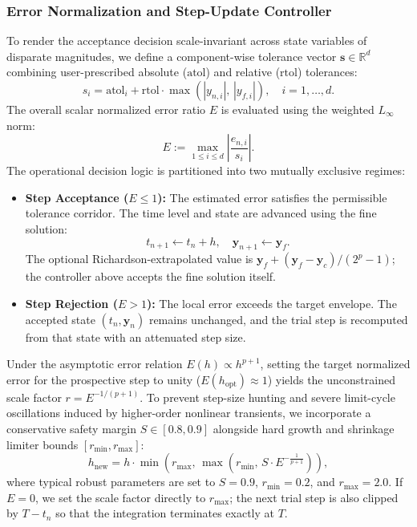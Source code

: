 \documentclass[11pt,a4paper]{article}
\theoremstyle{definition}
\theoremstyle{remark}
\begin{document}
\subsubsection{Error Normalization and Step-Update Controller}
To render the acceptance decision scale-invariant across state variables of disparate magnitudes, we define a component-wise tolerance vector $\mathbf{s} \in \mathbb{R}^d$ combining user-prescribed absolute ($\text{atol}$) and relative ($\text{rtol}$) tolerances:
\begin{equation}
\label{eq:scale_vector}
s_i = \text{atol}_i + \text{rtol} \cdot \max\left(|y_{n, i}|, \, |y_{f, i}|\right), \quad i = 1, \dots, d.
\end{equation}
The overall scalar normalized error ratio $E$ is evaluated using the weighted $L_\infty$ norm:
\begin{equation}
\label{eq:normalized_error_ratio}
E := \max_{1 \le i \le d} \left| \frac{\hat{e}_{n, i}}{s_i} \right|.
\end{equation}
The operational decision logic is partitioned into two mutually exclusive regimes:
\begin{itemize}
    \item \textbf{Step Acceptance ($E \le 1$):} The estimated error satisfies the permissible tolerance corridor. The time level and state are advanced using the fine solution:
    \begin{equation}
    \label{eq:accepted_fine_solution}
    t_{n+1} \gets t_n + h, \quad \mathbf{y}_{n+1} \gets \mathbf{y}_f.
    \end{equation}
    The optional Richardson-extrapolated value is $\mathbf{y}_f+(\mathbf{y}_f-\mathbf{y}_c)/(2^p-1)$; the controller above accepts the fine solution itself.
    \item \textbf{Step Rejection ($E > 1$):} The local error exceeds the target envelope. The accepted state $(t_n,\mathbf{y}_n)$ remains unchanged, and the trial step is recomputed from that state with an attenuated step size.
\end{itemize}

Under the asymptotic error relation $E(h) \propto h^{p+1}$, setting the target normalized error for the prospective step to unity ($E(h_{\text{opt}}) \approx 1$) yields the unconstrained scale factor $r = E^{-1/(p+1)}$. To prevent step-size hunting and severe limit-cycle oscillations induced by higher-order nonlinear transients, we incorporate a conservative safety margin $S \in [0.8, 0.9]$ alongside hard growth and shrinkage limiter bounds $[r_{\min}, r_{\max}]$:
\begin{equation}
\label{eq:step_update_formula}
h_{\text{new}} = h \cdot \min\left(r_{\max}, \, \max\left(r_{\min}, \, S \cdot E^{-\frac{1}{p+1}}\right)\right),
\end{equation}
where typical robust parameters are set to $S = 0.9$, $r_{\min} = 0.2$, and $r_{\max} = 2.0$. If $E=0$, we set the scale factor directly to $r_{\max}$; the next trial step is also clipped by $T-t_n$ so that the integration terminates exactly at $T$.
\end{document}
